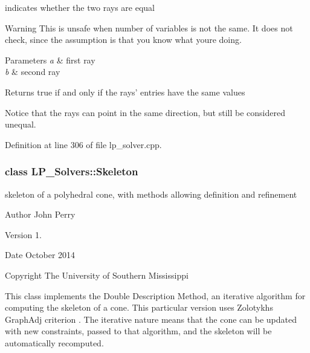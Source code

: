 indicates whether the two rays are equal 

\begin{DoxyWarning}{Warning}
This is unsafe when number of variables is not the same. It does not check, since the assumption is that you know what you\textquotesingle{}re doing. 
\end{DoxyWarning}

\begin{DoxyParams}{Parameters}
{\em a} & first ray \\
\hline
{\em b} & second ray \\
\hline
\end{DoxyParams}
\begin{DoxyReturn}{Returns}
{\ttfamily true} if and only if the rays' entries have the same values
\end{DoxyReturn}
Notice that the rays can point in the same direction, but still be considered unequal. 

Definition at line 306 of file lp\+\_\+solver.\+cpp.

\label{class_l_p___solvers_1_1_skeleton}
\subsubsection{class L\+P\+\_\+\+Solvers\+:\+:Skeleton}
skeleton of a polyhedral cone, with methods allowing definition and refinement 

\begin{DoxyAuthor}{Author}
John Perry 
\end{DoxyAuthor}
\begin{DoxyVersion}{Version}
1. 
\end{DoxyVersion}
\begin{DoxyDate}{Date}
October 2014 
\end{DoxyDate}
\begin{DoxyCopyright}{Copyright}
The University of Southern Mississippi
\end{DoxyCopyright}
This class implements the Double Description Method, an iterative algorithm for computing the skeleton of a cone. This particular version uses Zolotykh\textquotesingle{}s Graph\+Adj criterion \cite{Zolotych_DoubleDescription}. The iterative nature means that the cone can be updated with new constraints, passed to that algorithm, and the skeleton will be automatically recomputed. 

